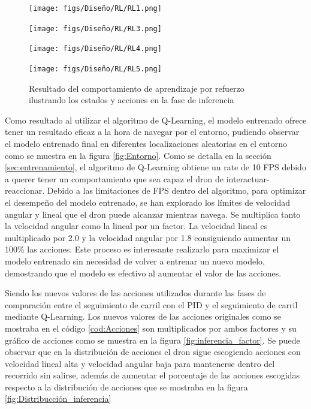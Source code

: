 \begin{figure}[H]
  \centering
  \begin{minipage}{0.3\textwidth}
    \texttt{[image: figs/Diseño/RL/RL1.png]}
  \end{minipage}
  \hfill
  \begin{minipage}{0.3\textwidth}
    \texttt{[image: figs/Diseño/RL/RL3.png]}
  \end{minipage}
  \hfill
  \begin{minipage}{0.3\textwidth}
    \texttt{[image: figs/Diseño/RL/RL4.png]}
  \end{minipage}
  \hfill
  \begin{minipage}{0.3\textwidth}
    \texttt{[image: figs/Diseño/RL/RL5.png]}
  \end{minipage}
  \caption{Resultado del comportamiento de aprendizaje por refuerzo ilustrando los estados y acciones en la fase de inferencia}
  \label{fig:inferencia-imagenes}
\end{figure}

Como resultado al utilizar el algoritmo de Q-Learning, el modelo entrenado ofrece tener un resultado eficaz a la hora de navegar por el entorno, pudiendo observar 
el modelo entrenado final en diferentes localizaciones aleatorias en el entorno como se muestra en la figura \ref{fig:Entorno}. Como se detalla en la sección \ref{sec:entrenamiento}, el algoritmo
de Q-Learning obtiene un rate de 10 FPS debido a querer tener un comportamiento que sea capaz el dron de interactuar-reaccionar. Debido a las limitaciones de FPS dentro del algoritmo, para optimizar
el desempeño del modelo entrenado, se han explorado los límites de velocidad angular y lineal que el dron puede alcanzar mientras navega. Se multiplica tanto la velocidad angular como la lineal
por un factor. La velocidad lineal es multiplicado por 2.0 y la velocidad angular por 1.8 consiguiendo aumentar un 100\% las acciones. Este proceso es interesante realizarlo para 
maximizar el modelo entrenado sin necesidad de volver a entrenar un nuevo modelo, demostrando que el modelo es efectivo al aumentar el valor de las acciones. \newline

Siendo los nuevos valores de las acciones utilizados durante las fases de comparación entre el seguimiento de carril con el PID y el seguimiento de carril mediante Q-Learning. Los nuevos
valores de las acciones originales como se mostraba en el código \ref{cod:Acciones} son multiplicados por ambos factores
y su gráfico de acciones como se muestra en la figura \ref{fig:inferencia_factor}. Se puede observar que en la distribución de acciones el dron
sigue escogiendo acciones con velocidad lineal alta y velocidad angular baja para mantenerse dentro del recorrido sin salirse, además de aumentar el porcentaje de las acciones escogidas respecto a la distribución de acciones
que se mostraba en la figura \ref{fig:Distribucción_inferencia}

